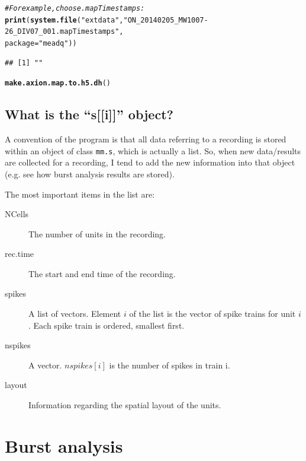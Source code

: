 \documentclass{article}\usepackage[]{graphicx}\usepackage[]{color}
\makeatletter
\newcommand{\hlstr}[1]{\textcolor[rgb]{0.192,0.494,0.8}{#1}}%
\newcommand{\hlcom}[1]{\textcolor[rgb]{0.678,0.584,0.686}{\textit{#1}}}%
\newcommand{\hlstd}[1]{\textcolor[rgb]{0.345,0.345,0.345}{#1}}%
\newcommand{\hlkwc}[1]{\textcolor[rgb]{0.333,0.667,0.333}{#1}}%
\newcommand{\hlkwd}[1]{\textcolor[rgb]{0.737,0.353,0.396}{\textbf{#1}}}%
\newenvironment{kframe}{%
 \def\at@end@of@kframe{}%
 \ifinner\ifhmode%
  \def\at@end@of@kframe{\end{minipage}}%
  \begin{minipage}{\columnwidth}%
 \fi\fi%
 \def\FrameCommand##1{\hskip\@totalleftmargin \hskip-\fboxsep
 \colorbox{shadecolor}{##1}\hskip-\fboxsep
     \hskip-\linewidth \hskip-\@totalleftmargin \hskip\columnwidth}%
 \MakeFramed {\advance\hsize-\width
   \@totalleftmargin\z@ \linewidth\hsize
   \@setminipage}}%
 {\par\unskip\endMakeFramed%
 \at@end@of@kframe}
\newenvironment{knitrout}{}{} %
\makeatother
\begin{document}
\begin{knitrout}
\color{fgcolor}\begin{kframe}
\begin{alltt}
\hlcom{# For example, choose .mapTimestamps:}
\hlkwd{print}\hlstd{(}\hlkwd{system.file}\hlstd{(}\hlstr{"extdata"}\hlstd{,} \hlstr{"ON_20140205_MW1007-26_DIV07_001.mapTimestamps"}\hlstd{,}
    \hlkwc{package} \hlstd{=} \hlstr{"meadq"}\hlstd{))}
\end{alltt}
\begin{verbatim}
## [1] ""
\end{verbatim}
\begin{alltt}
\hlkwd{make.axion.map.to.h5.dh}\hlstd{()}
\end{alltt}


{\ttfamily\noindent\bfseries{}}\end{kframe}
\end{knitrout}


\subsection{What is the ``s[[i]]'' object?}

A convention of the program is that all data referring to a recording
is stored within an object of class \texttt{mm.s}, which is actually a
list.  So, when new data/results are collected for a recording, I tend
to add the new information into that object (e.g. see how burst
analysis results are stored).

The most important items in the list are:
\begin{description}
\item[NCells] The number of units in the recording.
\item[rec.time] The start and end time of the recording.
\item[spikes] A list of vectors.  Element $i$ of the list is the
  vector of spike trains for unit $i$.  Each spike train is ordered, smallest first.
\item[nspikes] A vector.  $nspikes[i]$ is the number of spikes in
  train i.
\item[layout] Information regarding the spatial layout of the units.
\end{description}

\section*{Burst analysis}
\end{document}
